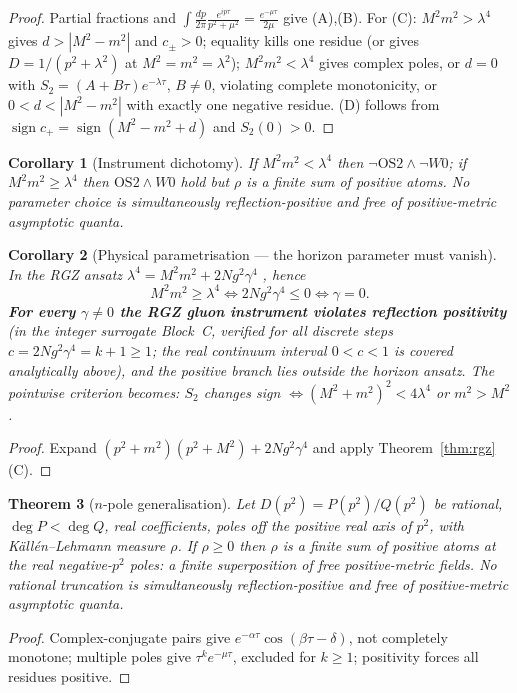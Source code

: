 \documentclass[11pt,a4paper]{article}
\theoremstyle{plain}
\newtheorem{theorem}{Theorem}[section]
\newtheorem{corollary}[theorem]{Corollary}
\theoremstyle{definition}
\theoremstyle{remark}
\newcommand{\OS}{\mathrm{OS}}\newcommand{\Gap}{\mathrm{Gap}}
\renewcommand{\_}{\oldunderscore\allowbreak}
\begin{document}
\begin{proof}
Partial fractions and $\int\frac{dp}{2\pi}\frac{e^{ip\tau}}{p^2+\mu^2}=\frac{e^{-\mu\tau}}{2\mu}$
give (A),(B). For (C): $M^2m^2>\lambda^4$ gives $d>|M^2-m^2|$ and $c_\pm>0$; equality kills one
residue (or gives $D=1/(p^2+\lambda^2)$ at $M^2=m^2=\lambda^2$); $M^2m^2<\lambda^4$ gives complex
poles, or $d=0$ with $S_2=(A+B\tau)e^{-\lambda\tau}$, $B\neq0$, violating complete monotonicity,
or $0<d<|M^2-m^2|$ with exactly one negative residue. (D) follows from
$\operatorname{sign}c_+=\operatorname{sign}(M^2-m^2+d)$ and $S_2(0)>0$.
\end{proof}
\begin{corollary}[Instrument dichotomy]\label{cor:rgz}
If $M^2m^2<\lambda^4$ then $\neg\OS2\wedge\neg W0$; if $M^2m^2\ge\lambda^4$ then $\OS2\wedge W0$
hold but $\rho$ is a finite sum of positive atoms. No parameter choice is simultaneously
reflection-positive and free of positive-metric asymptotic quanta.
\end{corollary}
\begin{corollary}[Physical parametrisation --- the horizon parameter must vanish]\label{cor:gamma}
In the RGZ ansatz $\lambda^4=M^2m^2+2Ng^2\gamma^4$ \cite{GarciaCapriMintz2026,Dudal2008}, hence
\[
M^2m^2\ge\lambda^4\iff 2Ng^2\gamma^4\le0\iff\gamma=0 .
\]
\textbf{For every $\gamma\neq0$ the RGZ gluon instrument violates reflection positivity} (in the integer surrogate Block~C, verified for all discrete steps $c=2Ng^2\gamma^4=k+1\ge1$; the real continuum interval $0<c<1$ is covered analytically above), and the
positive branch lies outside the horizon ansatz. The pointwise criterion becomes: $S_2$ changes
sign $\iff(M^2+m^2)^2<4\lambda^4$ or $m^2>M^2$.
\end{corollary}
\begin{proof}
Expand $(p^2+m^2)(p^2+M^2)+2Ng^2\gamma^4$ and apply Theorem~\ref{thm:rgz}(C).
\end{proof}
\begin{theorem}[$n$-pole generalisation]\label{thm:npole}
Let $D(p^2)=P(p^2)/Q(p^2)$ be rational, $\deg P<\deg Q$, real coefficients, poles off the
positive real axis of $p^2$, with K\"all\'en--Lehmann measure $\rho$. If $\rho\ge0$ then $\rho$
is a finite sum of positive atoms at the real negative-$p^2$ poles: a finite superposition of
free positive-metric fields. No rational truncation is simultaneously reflection-positive and
free of positive-metric asymptotic quanta.
\end{theorem}
\begin{proof}
Complex-conjugate pairs give $e^{-\alpha\tau}\cos(\beta\tau-\delta)$, not completely monotone;
multiple poles give $\tau^ke^{-\mu\tau}$, excluded for $k\ge1$; positivity forces all residues
positive.
\end{proof}
\end{document}
